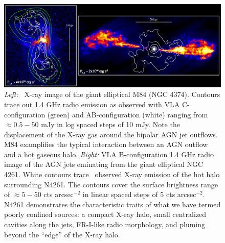 \begin{figure}[htp]
  \begin{center}
    \begin{minipage}[htp]{\linewidth}
      \includegraphics*[width=\textwidth, trim=0mm 0mm 0mm 0mm, clip]{f3.eps}
      \caption{{\it{Left:}} \chandra\ X-ray image of the giant
        elliptical M84 (NGC 4374). Contours trace out 1.4 GHz radio
        emission as observed with VLA C-configuration (green) and
        AB-configuration (white) ranging from $\approx 0.5-50$ mJy in
        log spaced steps of 10 mJy. Note the displacement of the X-ray
        gas around the bipolar AGN jet outflows. M84 examplifies the
        typical interaction between an AGN outflow and a hot gaseous
        halo. {\it{Right:}} VLA B-configuration 1.4 GHz radio image of
        the AGN jets eminating from the giant elliptical NGC
        4261. White contours trace \chandra\ observed X-ray emission
        of the hot halo surrounding N4261. The contours cover the
        surface brightness range of $\approx 5-50$ cts arcsec$^{-2}$
        in linear spaced steps of 5 cts arcsec$^{-2}$. N4261
        demonstrates the characteristic traits of what we have termed
        poorly confined sources: a compact X-ray halo, small
        centralized cavities along the jets, FR-I-like radio
        morphology, and pluming beyond the ``edge'' of the X-ray
        halo.}
      \label{fig:pics}
    \end{minipage}
  \end{center}
\end{figure}
